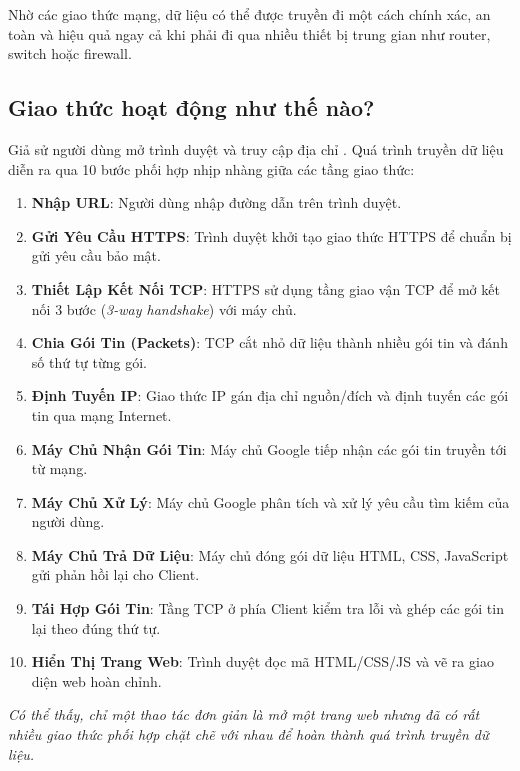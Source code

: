Nhờ các giao thức mạng, dữ liệu có thể được truyền đi một cách chính xác, an toàn và hiệu quả ngay cả khi phải đi qua nhiều thiết bị trung gian như router, switch hoặc firewall.

\subsection{Giao thức hoạt động như thế nào?}

Giả sử người dùng mở trình duyệt và truy cập địa chỉ . Quá trình truyền dữ liệu diễn ra qua 10 bước phối hợp nhịp nhàng giữa các tầng giao thức:

\begin{conceptBox}
\begin{enumerate}[label=\textbf{\color{conceptBorder}Bước \arabic*:}, leftmargin=4.8em, itemsep=3pt, parsep=0pt, topsep=4pt]
    \item \textbf{Nhập URL}: Người dùng nhập đường dẫn  trên trình duyệt.
    \item \textbf{Gửi Yêu Cầu HTTPS}: Trình duyệt khởi tạo giao thức HTTPS để chuẩn bị gửi yêu cầu bảo mật.
    \item \textbf{Thiết Lập Kết Nối TCP}: HTTPS sử dụng tầng giao vận TCP để mở kết nối 3 bước (\textit{3-way handshake}) với máy chủ.
    \item \textbf{Chia Gói Tin (Packets)}: TCP cắt nhỏ dữ liệu thành nhiều gói tin và đánh số thứ tự từng gói.
    \item \textbf{Định Tuyến IP}: Giao thức IP gán địa chỉ nguồn/đích và định tuyến các gói tin qua mạng Internet.
    \item \textbf{Máy Chủ Nhận Gói Tin}: Máy chủ Google tiếp nhận các gói tin truyền tới từ mạng.
    \item \textbf{Máy Chủ Xử Lý}: Máy chủ Google phân tích và xử lý yêu cầu tìm kiếm của người dùng.
    \item \textbf{Máy Chủ Trả Dữ Liệu}: Máy chủ đóng gói dữ liệu HTML, CSS, JavaScript gửi phản hồi lại cho Client.
    \item \textbf{Tái Hợp Gói Tin}: Tầng TCP ở phía Client kiểm tra lỗi và ghép các gói tin lại theo đúng thứ tự.
    \item \textbf{Hiển Thị Trang Web}: Trình duyệt đọc mã HTML/CSS/JS và vẽ ra giao diện web hoàn chỉnh.
\end{enumerate}
\end{conceptBox}
\textit{Có thể thấy, chỉ một thao tác đơn giản là mở một trang web nhưng đã có rất nhiều giao thức phối hợp chặt chẽ với nhau để hoàn thành quá trình truyền dữ liệu.}


